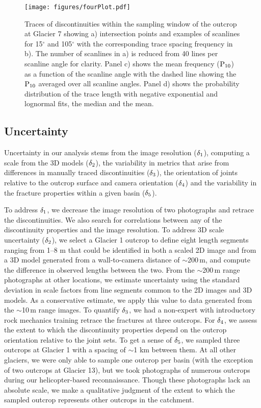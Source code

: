 \documentclass[draft,linenumbers]{agujournal}
\begin{document}
\begin{figure}[H]
  \centering
  \texttt{[image: figures/fourPlot.pdf]}
  \caption[]{Traces of discontinuities within the sampling window of the outcrop at Glacier 7 showing a) intersection points and examples of scanlines for 15$^{\circ}$ and 105$^{\circ}$ with the corresponding trace spacing frequency in b). The number of scanlines in a) is reduced from 40 lines per scanline angle for clarity. Panel c) shows the mean frequency ($\rm P_{10}$) as a function of the scanline angle with the dashed line showing the $\rm P_{10}$ averaged over all scanline angles. Panel d) shows the probability distribution of the trace length with negative exponential and lognormal fits, the median and the mean. }
\label{fp}
\end{figure}


\subsection{Uncertainty}

Uncertainty in our analysis stems from the image resolution ($\rm \delta_1$), computing a scale from the 3D models ($\rm \delta_2$), the variability in metrics that arise from differences in manually traced discontinuities ($\rm \delta_3$), the orientation of joints relative to the outcrop surface and camera orientation ($\rm \delta_4$) and the variability in the fracture properties within a given basin ($\rm \delta_5$). 

To address $\rm \delta_1$, we decrease the image resolution of two photographs and retrace the discontinuities. We also search for correlations between any of the discontinuity properties and the image resolution. To address 3D scale uncertainty ($\rm \delta_2$), we select a Glacier 1 outcrop to define eight length segments ranging from 1--8 m that could be identified in both a scaled 2D image and from a 3D model generated from a wall-to-camera distance of $\sim$200\,m, and compute the difference in observed lengths between the two. From the $\sim$200\,m range photographs at other locations, we estimate uncertainty using the standard deviation in scale factors from line segments common to the 2D images and 3D models. As a conservative estimate, we apply this value to data generated from the $\sim$10\,m range images. To quantify $\rm \delta_3$, we had a non-expert with introductory rock mechanics training retrace the fractures at three outcrops. For $\rm \delta_4$, we assess the extent to which the discontinuity properties depend on the outcrop orientation relative to the joint sets. To get a sense of $\rm \delta_5$, we sampled three outcrops at Glacier 1 with a spacing of $\sim$1 km between them. At all other glaciers, we were only able to sample one outcrop per basin (with the exception of two outcrops at Glacier 13), but we took photographs of numerous outcrops during our helicopter-based reconnaissance. Though these photographs lack an absolute scale, we make a qualitative judgment of the extent to which the sampled outcrop represents other outcrops in the catchment. 
\end{document}
